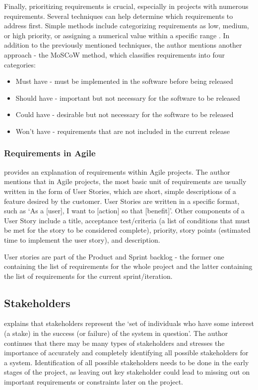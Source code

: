 Finally, prioritizing requirements is crucial, especially in projects with numerous requirements. Several techniques can help determine which requirements to address first. Simple methods include categorizing requirements as low, medium, or high priority, or assigning a numerical value within a specific range \parencite{moscow}. In addition to the previously mentioned techniques, the author mentions another approach - the MoSCoW method, which classifies requirements into four categories: 
\begin{itemize}
    \item Must have - must be implemented in the software before being released
    \item Should have - important but not necessary for the software to be released
    \item Could have - desirable but not necessary for the software to be released
    \item Won't have - requirements that are not included in the current release
\end{itemize}

\subsubsection{Requirements in Agile}

\textcite[191]{requirements} provides an explanation of requirements within Agile projects. The author mentions that in Agile projects, the most basic unit of requirements are usually written in the form of User Stories, which are short, simple descriptions of a feature desired by the customer. User Stories are written in a specific format, such as `As a [user], I want to [action] so that [benefit]'. Other components of a User Story include a title, acceptance test/criteria (a list of conditions that must be met for the story to be considered complete), priority, story points (estimated time to implement the user story), and description.

User stories are part of the Product and Sprint backlog - the former one containing the list of requirements for the whole project and the latter containing the list of requirements for the current sprint/iteration.

\subsection{Stakeholders}

\textcite[34]{requirements} explains that stakeholders represent the `set of individuals who have some interest (a stake) in the success (or failure) of the system in question'. The author continues that there may be many types of stakeholders and stresses the importance of accurately and completely identifying all possible stakeholders for a system. Identification of all possible stakeholders needs to be done in the early stages of the project, as leaving out key stakeholder could lead to missing out on important requirements or constraints later on the project. 

